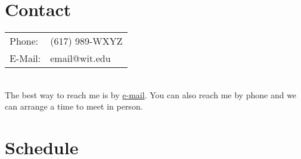 \documentclass{wit_schedule}
\author{Professor Foo}
\date{Spring 1984}
\begin{document}
\section*{Contact}

\begin{tabular}{l l}
Phone: & (617) 989-WXYZ \\
E-Mail: & email@wit.edu \\
\end{tabular}
\\

The best way to reach me is by \underline{e-mail}. You can also reach me by phone and we can arrange a time to meet in person.

\section*{Schedule}

\begin{ScheduleWeek}

	
	
	

\end{ScheduleWeek}
\end{document}
